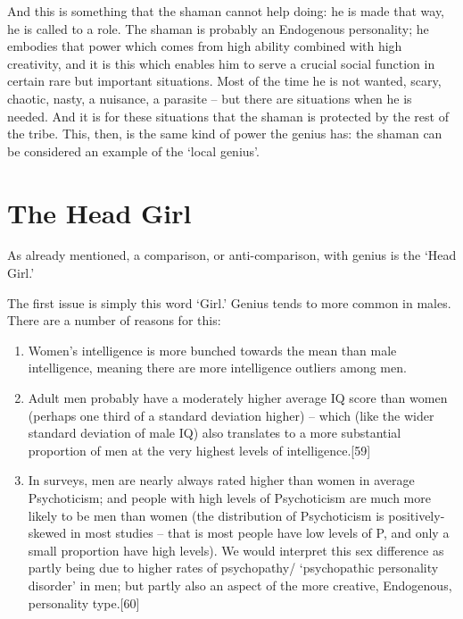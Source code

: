 \documentclass[
]{book}
\begin{document}
And this is something that the shaman cannot help doing: he is made that way, he is called to a role. The shaman is probably an Endogenous personality; he embodies that power which comes from high ability combined with high creativity, and it is this which enables him to serve a crucial social function in certain rare but important situations. Most of the time he is not wanted, scary, chaotic, nasty, a nuisance, a parasite -- but there are situations when he is needed. And it is for these situations that the shaman is protected by the rest of the tribe.
This, then, is the same kind of power the genius has: the shaman can be considered an example of the `local genius'.

\hypertarget{the-head-girl}{%
\section{The Head Girl}\label{the-head-girl}}

As already mentioned, a comparison, or anti-comparison, with genius is the `Head Girl.'

The first issue is simply this word `Girl.' Genius tends to more common in males. There are a number of reasons for this:

\begin{enumerate}
\def\labelenumi{\arabic{enumi}.}
\item
  Women's intelligence is more bunched towards the mean than male intelligence, meaning there are more intelligence outliers among men.
\item
  Adult men probably have a moderately higher average IQ score than women (perhaps one third of a standard deviation higher) -- which (like the wider standard deviation of male IQ) also translates to a more substantial proportion of men at the very highest levels of intelligence.{[}59{]}
\item
  In surveys, men are nearly always rated higher than women in average Psychoticism; and people with high levels of Psychoticism are much more likely to be men than women (the distribution of Psychoticism is positively-skewed in most studies -- that is most people have low levels of P, and only a small proportion have high levels). We would interpret this sex difference as partly being due to higher rates of psychopathy/ `psychopathic personality disorder' in men; but partly also an aspect of the more creative, Endogenous, personality type.{[}60{]}
\end{enumerate}
\end{document}
